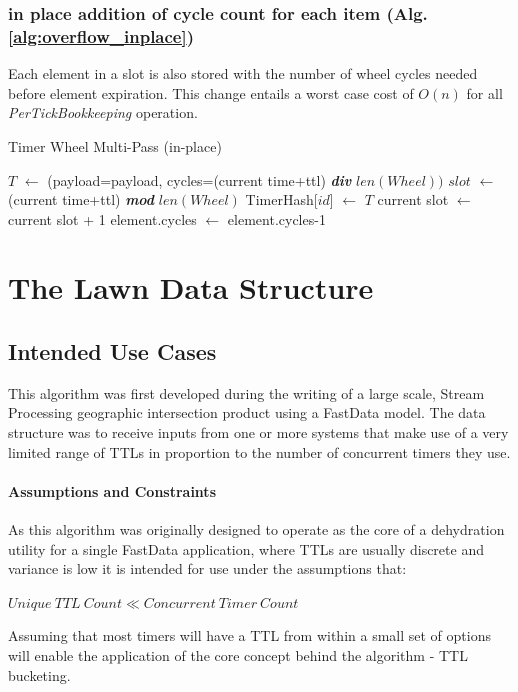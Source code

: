 \documentclass[conference]{IEEEtran}
\newcommand*\Let[2]{\State #1 $\gets$ #2}
\begin{document}
\subsubsection{in place addition of cycle count for each item (Alg. \ref{alg:overflow_inplace})} Each element in a slot is also stored with the number of wheel cycles needed before element expiration. This change entails a worst case cost of $O(n)$ for all \textit{PerTickBookkeeping} operation.

\begin{algorithm}
	\caption{Timer Wheel Multi-Pass (in-place)\label{alg:overflow_inplace}}
	\begin{algorithmic}[1]
		\Statex
		\Let{$T$}{(payload=payload, cycles=(current time+ttl) \textit{\textbf{div}} $len(Wheel))$}
		\Let{$slot$}{(current time+ttl) \textit{\textbf{mod}} $len(Wheel)$}
		\Let{TimerHash[$id$]}{$T$}
		\EndFunction
		\Statex
		\Let{current slot}{current slot + 1} 
			\Let{element.cycles}{element.cycles-1}
			\EndIf
		\EndFor
		\EndFunction
	\end{algorithmic}
\end{algorithm}

\section{The Lawn Data Structure}
 
\subsection{Intended Use Cases}

This algorithm was first developed during the writing of a large scale, Stream Processing geographic intersection product\cite{VUSR} using a FastData\cite{GP} model. The data structure was to receive inputs from one or more systems that make use of a very limited range of TTLs in proportion to the number of concurrent timers they use. 

\paragraph{Assumptions and Constraints}
As this algorithm was originally designed to operate as the core of a dehydration utility for a single FastData application, where TTLs are usually discrete and variance is low it is intended for use under the assumptions that: 
\begin{center}
	$ Unique\ TTL\ Count \ll Concurrent\ Timer\ Count $
\end{center}
Assuming that most timers will have a TTL from within a small set of options will enable the application of the core concept behind the algorithm - TTL bucketing. 
\end{document}
